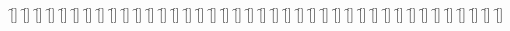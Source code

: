 \begin{questions}
\begin{multicols}{2}
        \question  \f[]
        \question  \f[]
        \question  \f[]
        \question  \f[]
        \question  \f[]
        \question  \f[]
        \question  \f[]
        \question  \f[]
        \question  \f[]
        \question  \f[]
        \question  \f[]
        \question  \f[]
        \question  \f[]
        \question  \f[]
        \question  \f[]
        \question  \f[]
        \question  \f[]
        \question  \f[]
        \question  \f[]
        \question  \f[]
        \question  \f[]
        \question  \f[]
        \question  \f[]
        \question  \f[]
        \question  \f[]
        \question  \f[]
        \question  \f[]
        \question  \f[]
        \question  \f[]
        \question  \f[]
        \question  \f[]
        \question  \f[]
        \question  \f[]
        \question  \f[]
        \question  \f[]
        \question  \f[]
        \question  \f[]
        \question  \f[]
        \question  \f[]
        \question  \f[]
    \end{multicols}
\end{questions}
